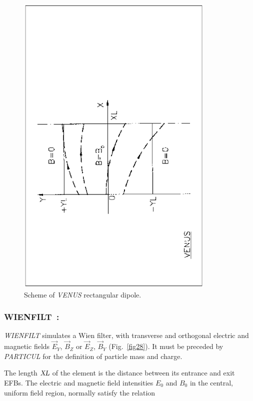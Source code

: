 {\vfill
\begin{figure}[H]
\centerline{\includegraphics[height=15cm,angle=-90]{Fig32.ps}}
\caption{\label{fig32}Scheme of \textsl{VENUS} rectangular dipole.}
\end{figure}
\vfill

\newpage

\subsubsection*{WIENFILT~: \WIENFILTTitl}\label{WIENFILT} 
\medskip 

\textsl{WIENFILT} simulates a Wien filter, with transverse and
orthogonal electric and magnetic fields $ \vec  E_Y$,  $ \vec  B_Z $ or $ \vec  E_Z$, 
 $ \vec  B_Y$ (Fig.~\ref{fig28}).
 It must be preceded by \textsl{PARTICUL} for the definition of particle mass and charge.  
\medskip

\noindent The length $ \textsl{XL} $ of the element is the distance between its
entrance and exit EFBs. The electric and magnetic field intensities $ E_0 $ and $ B_0 $ in the 
central, uniform field region, normally satisfy the relation
 
}
